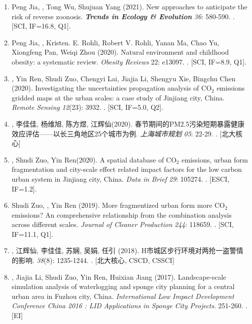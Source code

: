 \begin{enumerate}
\item
    Peng Jia\CS, \Shaoqing, Tong Wu, Shujuan Yang (2021).
    New approaches to anticipate the risk of reverse zoonosis.
    \textbf{\textit{Trends in Ecology \& Evolution}} \textit{36}: 580-590.
    . [SCI, IF=16.8, Q1].
\item
    Peng Jia\CS, \Shaoqing, Kristen. E. Rohli, Robert V. Rohli, Yanan Ma, Chao Yu, Xiongfeng Pan, Weiqi Zhou (2020).
    Natural environment and childhood obesity: a systematic review.
    \textit{Obesity Reviews} 22: e13097.
    . [SCI, IF=8.9, Q1].
\item
    \Shaoqing\CF, Yin Ren\CF, Shudi Zuo\CS, Chengyi Lai, Jiajia Li, Shengyu Xie, Bingchu Chen (2020).
    Investigating the uncertainties propagation analysis of CO$_2$ emissions gridded maps at the urban scales: a case study of Jinjiang city, China. 
    \textit{Remote Sensing} \textit{12}(23): 3932.
    . [SCI, IF=5.0, Q2].
\item
    {}, 李佳佳, 杨维旭, 陈方煜, 江辉仙\CS(2020).
    春节期间的PM2.5污染短期暴露健康效应评估——以长三角地区25个城市为例.
    \textit{上海城市规划} \textit{05}: 22-29.
    . [北大核心] 
\item
    \Shaoqing, Shudi Zuo, Yin Ren\CS (2020).
    A spatial database of CO$_2$ emissions, urban form fragmentation and city-scale effect related impact factors for the low carbon urban system in Jinjiang city, China.
    \textit{Data in Brief} \textit{29}: 105274.
    . [ESCI, IF=1.2].
\item
    Shudi Zuo, \Shaoqing, Yin Ren (2019).
    More fragmentized urban form more CO$_2$ emissions? An comprehensive relationship from the combination analysis across different scales.
    \textit{Journal of Cleaner Production} \textit{244}: 118659.
    . [SCI, IF=11.1, Q1].
\item
    {}, 江辉仙\CS, 李佳佳, 苏娴, 吴娟, 任引 (2018).
	H市城区步行环境对两抢一盗警情的影响.
    {}  \textit{38}(8): 1235-1244.
    . [北大核心, CSCD, CSSCI]
\item
    \Shaoqing, Jiajia Li, Shudi Zuo, Yin Ren\CS, Huixian Jiang (2017).
	Landscape-scale simulation analysis of waterlogging and sponge city planning for a central urban area in Fuzhou city, China.
    \textit{International Low Impact Development Conference China 2016 : LID Applications in Sponge City Projects}. 251-260.
    . [EI]
\end{enumerate}

